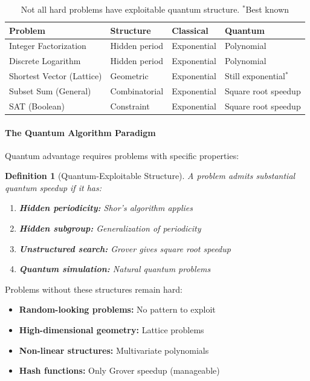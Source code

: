 \documentclass[11pt,a4paper]{article}
\newtheorem{definition}{Definition}
\begin{document}
\begin{table}[h]
\centering
\begin{tabular}{|l|l|l|l|}
\hline
\textbf{Problem} & \textbf{Structure} & \textbf{Classical} & \textbf{Quantum} \\
\hline
Integer Factorization & Hidden period & Exponential & Polynomial \\
Discrete Logarithm & Hidden period & Exponential & Polynomial \\
\hline
Shortest Vector (Lattice) & Geometric & Exponential & Still exponential$^*$ \\
Subset Sum (General) & Combinatorial & Exponential & Square root speedup \\
SAT (Boolean) & Constraint & Exponential & Square root speedup \\
\hline
\end{tabular}
\caption{Not all hard problems have exploitable quantum structure. $^*$Best known}
\end{table}

\paragraph{The Quantum Algorithm Paradigm}

Quantum advantage requires problems with specific properties:

\begin{definition}[Quantum-Exploitable Structure]
A problem admits substantial quantum speedup if it has:
\begin{enumerate}
    \item \textbf{Hidden periodicity:} Shor's algorithm applies
    \item \textbf{Hidden subgroup:} Generalization of periodicity
    \item \textbf{Unstructured search:} Grover gives square root speedup
    \item \textbf{Quantum simulation:} Natural quantum problems
\end{enumerate}
\end{definition}

Problems without these structures remain hard:
\begin{itemize}
    \item \textbf{Random-looking problems:} No pattern to exploit
    \item \textbf{High-dimensional geometry:} Lattice problems
    \item \textbf{Non-linear structures:} Multivariate polynomials
    \item \textbf{Hash functions:} Only Grover speedup (manageable)
\end{itemize}
\end{document}
